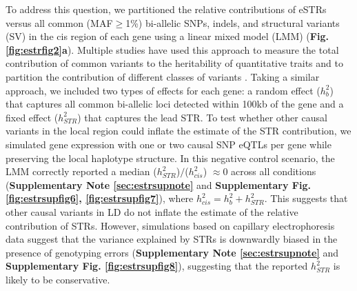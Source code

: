 To address this question, we partitioned the relative contributions of eSTRs versus all common (MAF$\geq$1\%) bi-allelic SNPs, indels, and structural variants (SV) in the cis region of each gene using a linear mixed model (LMM) (\textbf{Fig. \ref{fig:estrfig2}a}). Multiple studies have used this approach to measure the total contribution of common variants to the heritability of quantitative traits and to partition the contribution of different classes of variants \cite{YangBenyaminMcEvoyEtAl2010,GusevLeeNealeEtAl2014}. Taking a similar approach, we included two types of effects for each gene: a random effect ($h_b^2$) that captures all common bi-allelic loci detected within 100kb of the gene and a fixed effect ($h_{STR}^2$) that captures the lead STR. To test whether other causal variants in the local region could inflate the estimate of the STR contribution, we simulated gene expression with one or two causal SNP eQTLs per gene while preserving the local haplotype structure. In this negative control scenario, the LMM correctly reported a median ($h_{STR}^2$)$/$($h_{cis}^2 $) $\approx 0$ across all conditions (\textbf{Supplementary Note \ref{sec:estrsupnote}} and \textbf{Supplementary Fig. \ref{fig:estrsupfig6}, \ref{fig:estrsupfig7}}), where $h_{cis}^2=h_b^2+h_{STR}^2$. This suggests that other causal variants in LD do not inflate the estimate of the relative contribution of STRs. However, simulations based on capillary electrophoresis data suggest that the variance explained by STRs is downwardly biased in the presence of genotyping errors (\textbf{Supplementary Note \ref{sec:estrsupnote}} and \textbf{Supplementary Fig. \ref{fig:estrsupfig8}}), suggesting that the reported $h_{STR}^2$ is likely to be conservative.  

